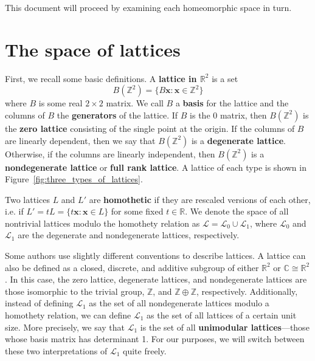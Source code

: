 \documentclass[12pt,twoside]{reedthesis}
\theoremstyle{definition}
\newcommand{\Z}{\mathbb{Z}}
\newcommand{\R}{\mathbb{R}}
\newcommand{\C}{\mathbb{C}}
\newcommand{\LS}{\mathcal{L}}
\renewcommand{\vec}[1]{\mathbf{#1}}
\newcommand{\defnphrase}[1]{\textbf{#1}}
\begin{document}
This document will proceed by examining each homeomorphic space in turn.

\chapter{The space of lattices}

First, we recall some basic definitions.
A \defnphrase{lattice in $\R^2$} is a set
\begin{equation*}
  B(\Z^2) = \{ B \vec x : \vec x \in \Z^2 \}
\end{equation*}
where $B$ is some real $2 \times 2$ matrix.
We call $B$ a \defnphrase{basis} for the lattice and the columns of $B$ the \defnphrase{generators} of the lattice.
If $B$ is the 0 matrix, then $B(\Z^2)$ is the \defnphrase{zero lattice} consisting of the single point at the origin.
If the columns of $B$ are linearly dependent, then we say that $B(\Z^2)$ is a \defnphrase{degenerate lattice}.
Otherwise, if the columns are linearly independent, then $B(\Z^2)$ is a \defnphrase{nondegenerate lattice} or \defnphrase{full rank lattice}.
A lattice of each type is shown in Figure~\ref{fig:three_types_of_lattices}.

Two lattices $L$ and $L'$ are \defnphrase{homothetic} if they are rescaled versions of each other, i.e. if $L' = tL = \{t \vec x : \vec x \in L\}$ for some fixed $t \in \R$.
We denote the space of all nontrivial lattices modulo the homothety relation as $\LS = \LS_0 \cup \LS_1$, where $\LS_0$ and $\LS_1$ are the degenerate and nondegenerate lattices, respectively.

Some authors use slightly different conventions to describe lattices.
A lattice can also be defined as a closed, discrete, and additive subgroup of either $\R^2$ or $\C \cong \R^2$.
In this case, the zero lattice, degenerate lattices, and nondegenerate lattices are those isomorphic to the trivial group, $\Z$, and $\Z \oplus \Z$, respectively.
Additionally, instead of defining $\LS_1$ as the set of all nondegenerate lattices modulo a homothety relation, we can define $\LS_1$ as the set of all lattices of a certain unit size.
More precisely, we say that $\LS_1$ is the set of all \defnphrase{unimodular lattices}---those whose basis matrix has determinant 1.
For our purposes, we will switch between these two interpretations of $\LS_1$ quite freely.
\end{document}
